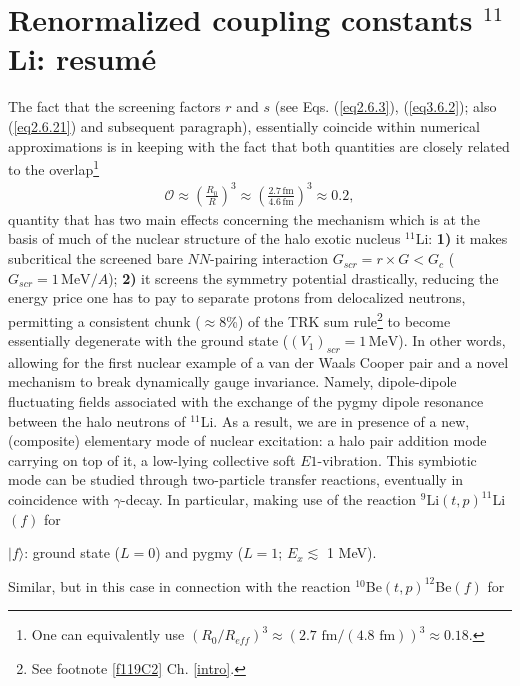  \section{Renormalized coupling constants $^{11}$Li: resum\'e}\label{C2SF2}
The fact that the screening factors   $r$ and $s$ (see Eqs. (\ref{eq2.6.3}),  (\ref{eq3.6.2}); also (\ref{eq2.6.21}) and subsequent paragraph), essentially coincide within numerical approximations is in keeping with the fact that both quantities are closely related to the overlap\footnote{One can equivalently use $\left(R_0/R_{eff}\right)^3\approx\left( 2.7\text{ fm}/(4.8\text{ fm})\right)^3\approx0.18$.}
  \begin{align}
\mathcal{O}\approx\left(\frac{R_0}{R}\right)^3\approx\left(\frac{2.7\,\text{fm}}{4.6\,\text{fm}}\right)^3\approx0.2,
  \end{align}
quantity that has two main effects concerning the mechanism which is at the basis of much of the nuclear structure of the halo exotic nucleus $^{11}$Li: \textbf{1)} it makes subcritical the screened bare $NN$-pairing interaction $G_{scr}=r\times G<G_c$ ($G_{scr}=1\,\text{MeV}/A$); \textbf{2)} it screens the symmetry potential drastically, reducing the energy price one has to pay to separate protons from delocalized neutrons, permitting a consistent chunk ($\approx 8$\%) of the TRK sum rule\footnote{See footnote \ref{f119C2} Ch. \ref{intro}.} to  become essentially degenerate with the  ground state ($(V_1)_{scr}=1 \,\text{MeV}$). In other words,  allowing for the first nuclear example of a van der Waals Cooper pair and a novel mechanism to break dynamically gauge invariance. Namely, dipole-dipole fluctuating fields associated with the exchange of the pygmy dipole resonance between the halo neutrons of $^{11}$Li. As a result, we are in presence of a new, (composite) elementary mode of nuclear excitation: a halo pair addition mode carrying on top of it, a low-lying collective soft $E1$-vibration. This symbiotic mode can be studied through two-particle transfer reactions, eventually in coincidence with $\gamma$-decay. In particular, making use of the reaction $^{9}$Li$(t,p)^{11}$Li$(f)$ for\\
\vspace{0.1cm}
\vspace{0.2cm}
\centerline{$|f\rangle$: ground state ($L=0$) and pygmy ($L=1$; $E_x\lesssim$ 1 MeV).}
Similar, but in this case in connection with the reaction $^{10}$Be$(t,p)^{12}$Be$(f)$ for\\

